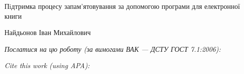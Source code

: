 \documentclass[a4paper,14pt]{extarticle}
\newcommand{\articleTitleUkr}{
Пiдтримка процесу запам’ятовування за допомогою програми для електронної книги}
\newcommand{\authorFullNameUkr}{Найдьонов Іван Михайлович}
\begin{document}
\begin{center}\bf
\par\MakeUppercase\articleTitleUkr
\par\authorFullNameUkr
\end{center}

\par\bigskip\textit{Послатися на цю роботу (за вимогами ВАК --- ДСТУ ГОСТ 7.1:2006):}
\par{}
\par\bigskip\textit{Cite this work (using APA):}
\par{}

\end{document}
